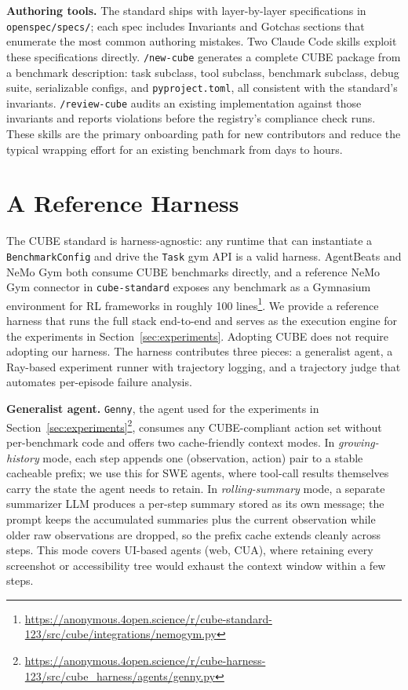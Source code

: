 \documentclass{article}
\newcommand{\mypar}[1]{\par\noindent\textbf{#1}\enspace}
\begin{document}
\mypar{Authoring tools.}
The standard ships with layer-by-layer specifications in \texttt{openspec/specs/};
each spec includes Invariants and Gotchas sections that enumerate the most common
authoring mistakes.
Two Claude Code skills exploit these specifications directly.
\texttt{/new-cube} generates a complete CUBE package from a benchmark description:
task subclass, tool subclass, benchmark subclass, debug suite, serializable configs,
and \texttt{pyproject.toml}, all consistent with the standard's invariants.
\texttt{/review-cube} audits an existing implementation against those invariants
and reports violations before the registry's compliance check runs.
These skills are the primary onboarding path for new contributors and reduce
the typical wrapping effort for an existing benchmark from days to hours.

\section{A Reference Harness}
\label{sec:harness}

The CUBE standard is harness-agnostic: any runtime that can instantiate a
\texttt{BenchmarkConfig} and drive the \texttt{Task} gym API is a valid
harness. AgentBeats and NeMo Gym both consume CUBE benchmarks directly,
and a reference NeMo Gym connector in \texttt{cube-standard} exposes any
benchmark as a Gymnasium environment for RL frameworks in roughly 100 lines\footnote{\href{https://anonymous.4open.science/r/cube-standard-123/src/cube/integrations/nemogym.py}{https://anonymous.4open.science/r/cube-standard-123/src/cube/integrations/nemogym.py}}.
We provide a reference harness that runs the full stack end-to-end and serves
as the execution engine for the experiments in Section~\ref{sec:experiments}.
Adopting CUBE does not require adopting our harness.
The harness contributes three pieces: a generalist agent, a Ray-based
experiment runner with trajectory logging, and a trajectory judge that
automates per-episode failure analysis.

\mypar{Generalist agent.}
\texttt{Genny}, the agent used for the experiments in
Section~\ref{sec:experiments}\footnote{\href{https://anonymous.4open.science/r/cube-harness-123/src/cube_harness/agents/genny.py}{https://anonymous.4open.science/r/cube-harness-123/src/cube\_harness/agents/genny.py}},
consumes any CUBE-compliant action set without per-benchmark code and
offers two cache-friendly context modes. In \emph{growing-history}
mode, each step appends one (observation, action) pair to a stable
cacheable prefix; we use this for SWE agents, where tool-call results
themselves carry the state the agent needs to retain. In
\emph{rolling-summary} mode, a separate summarizer LLM produces a
per-step summary stored as its own message; the prompt keeps the
accumulated summaries plus the current observation while older raw
observations are dropped, so the prefix cache extends cleanly across
steps. This mode covers UI-based agents (web, CUA), where retaining
every screenshot or accessibility tree would exhaust the context
window within a few steps.
\end{document}
